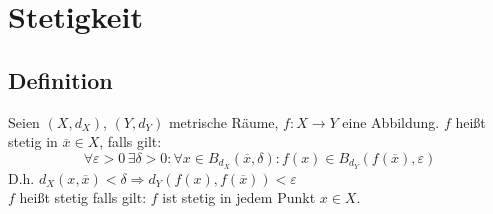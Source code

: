 \section{Stetigkeit} %
\label{sec:stetigkeit}

\subsection[Definition von Stetigkeit in metrischen Räumen]{Definition} %
\label{sub:31}
Seien $(X,d_X)$, $(Y, d_Y)$ metrische Räume, $f : X \to Y$ eine Abbildung. $f$ heißt stetig  in $\overline{x} \in X$,  falls gilt:
\[
	\forall \varepsilon >0 \, \exists \delta >0 : \forall x \in B_{d_X} (\overline{x}, \delta ) : f(x) \in B_{d_Y}  ( f(\overline{x}), \varepsilon )
\]
D.h. $d_X(x, \overline{x}) < \delta  \Rightarrow  d_Y( f(x), f(\overline{x}) ) < \varepsilon$ \\
$f$ heißt stetig falls gilt: $f$ ist stetig in jedem Punkt $x \in X$.

